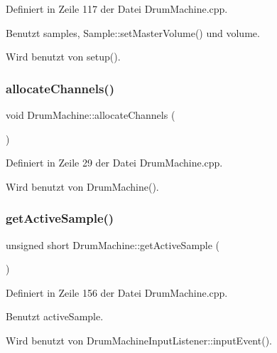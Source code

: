 Definiert in Zeile 117 der Datei Drum\+Machine.\+cpp.



Benutzt samples, Sample\+::set\+Master\+Volume() und volume.



Wird benutzt von setup().

\mbox{\label{class_drum_machine_a5a42497c3a1f390537b6c12fddab1619}} 
\subsubsection{\texorpdfstring{allocate\+Channels()}{allocateChannels()}}
{\footnotesize\ttfamily void Drum\+Machine\+::allocate\+Channels (\begin{DoxyParamCaption}{ }\end{DoxyParamCaption})\hspace{0.3cm}{\ttfamily [private]}}



Definiert in Zeile 29 der Datei Drum\+Machine.\+cpp.



Wird benutzt von Drum\+Machine().

\mbox{\label{class_drum_machine_ac8ef152a82bbce61bc1e2715c3e476b9}} 
\subsubsection{\texorpdfstring{get\+Active\+Sample()}{getActiveSample()}}
{\footnotesize\ttfamily unsigned short Drum\+Machine\+::get\+Active\+Sample (\begin{DoxyParamCaption}{ }\end{DoxyParamCaption})}



Definiert in Zeile 156 der Datei Drum\+Machine.\+cpp.



Benutzt active\+Sample.



Wird benutzt von Drum\+Machine\+Input\+Listener\+::input\+Event().

